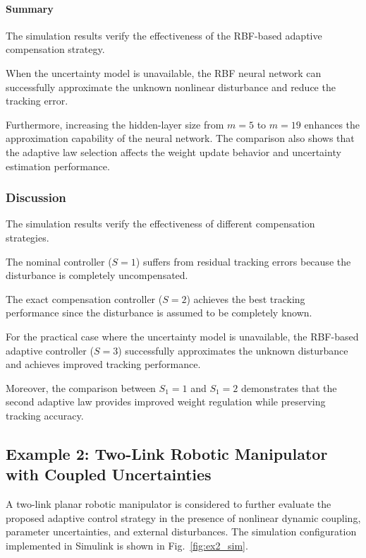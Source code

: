 \paragraph{Summary}

The simulation results verify the effectiveness of the RBF-based adaptive
compensation strategy.

When the uncertainty model is unavailable, the RBF neural network can
successfully approximate the unknown nonlinear disturbance and reduce the
tracking error.

Furthermore, increasing the hidden-layer size from $m=5$ to $m=19$
enhances the approximation capability of the neural network.
The comparison also shows that the adaptive law selection affects the
weight update behavior and uncertainty estimation performance.


\subsubsection{Discussion}

The simulation results verify the effectiveness of different compensation
strategies.

The nominal controller ($S=1$) suffers from residual tracking errors because
the disturbance is completely uncompensated.

The exact compensation controller ($S=2$) achieves the best tracking
performance since the disturbance is assumed to be completely known.

For the practical case where the uncertainty model is unavailable,
the RBF-based adaptive controller ($S=3$) successfully approximates the
unknown disturbance and achieves improved tracking performance.

Moreover, the comparison between $S_1=1$ and $S_1=2$ demonstrates that the
second adaptive law provides improved weight regulation while preserving
tracking accuracy.

\subsection{Example 2: Two-Link Robotic Manipulator with Coupled Uncertainties}

A two-link planar robotic manipulator is considered to further evaluate
the proposed adaptive control strategy in the presence of nonlinear
dynamic coupling, parameter uncertainties, and external disturbances.
The simulation configuration implemented in Simulink is shown in
Fig.~\ref{fig:ex2_sim}.


